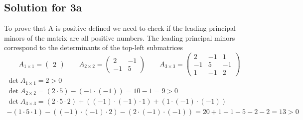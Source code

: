 \documentclass[a4paper,fleqn,12pt]{article}
\begin{document}
\subsection{Solution for 3a}
To prove  that A is positive defined we need to check if the leading principal minors of the matrix are all positive numbers. The leading principal minors correspond to the determinants of the top-left submatrices 
$$
A_{1 \times 1} = \begin{pmatrix} 2  \end{pmatrix} \qquad 
A_{2 \times 2} = \begin{pmatrix} 2 & -1 \\ -1 & 5 \end{pmatrix} \qquad 
A_{3 \times 3} = \begin{pmatrix}
2 & -1 & 1 \\
-1 & 5 & -1 \\
1 & -1 & 2 
\end{pmatrix}
$$
\begin{gather*}
\det A_{1 \times 1} = 2 > 0 \\ 
\det A_{2 \times 2} = (2 \cdot 5) - (-1 \cdot (-1)) = 10 -1 = 9 > 0 \\
\det A_{3 \times 3} = (2 \cdot 5 \cdot 2) + ( (-1) \cdot (-1) \cdot 1) + (1 \cdot (-1) \cdot (-1))\\
 - (1 \cdot 5 \cdot 1) - ((-1) \cdot (-1) \cdot 2) - (2 \cdot (-1) \cdot (-1) ) = 20 +1 +1 - 5 -2 -2 = 13 > 0
\end{gather*}
\end{document}
